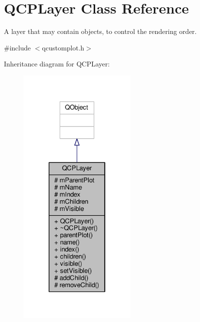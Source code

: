 \hypertarget{class_q_c_p_layer}{}\section{Q\+C\+P\+Layer Class Reference}
\label{class_q_c_p_layer}


A layer that may contain objects, to control the rendering order.  




{\ttfamily \#include $<$qcustomplot.\+h$>$}



Inheritance diagram for Q\+C\+P\+Layer\+:\nopagebreak
\begin{figure}[H]
\begin{center}
\leavevmode
\includegraphics[width=166pt]{class_q_c_p_layer__inherit__graph}
\end{center}
\end{figure}


